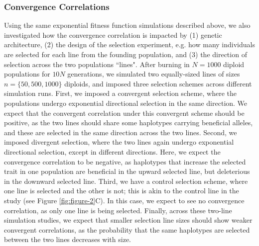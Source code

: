 \documentclass[11pt]{article}
\begin{document}
\subsubsection{Convergence Correlations}

Using the same exponential fitness function simulations described above, we
also investigated how the convergence correlation is impacted by (1) genetic
architecture, (2) the design of the selection experiment, e.g. how many
individuals are selected for each line from the founding population, and (3)
the direction of selection across the two populations ``lines". After burning
in $N = 1000$ diploid populations for $10N$ generations, we simulated two
equally-sized lines of sizes $n = \{50, 500, 1000\}$ diploids, and imposed
three selection schemes across different simulation runs. First, we imposed a
convergent selection scheme, where the populations undergo exponential
directional selection in the same direction. We expect that the convergent
correlation under this convergent scheme should be positive, as the two lines
should share some haplotypes carrying beneficial alleles, and these are
selected in the same direction across the two lines. Second, we imposed
divergent selection, where the two lines again undergo exponential directional
selection, except in different directions. Here, we expect the convergence
correlation to be negative, as haplotypes that increase the selected trait in
one population are beneficial in the upward selected line, but deleterious in
the downward selected line. Third, we have a control selection scheme, where
one line is selected and the other is not; this is akin to the control line in
the \textcite{Castro2019-uk} study (see Figure \ref{fig:figure-2}C). In this
case, we expect to see no convergence correlation, as only one line is being
selected. Finally, across these two-line simulation studies, we expect that
smaller selection line sizes should show weaker convergent correlations, as the
probability that the same haplotypes are selected between the two lines
decreases with size.
\end{document}
